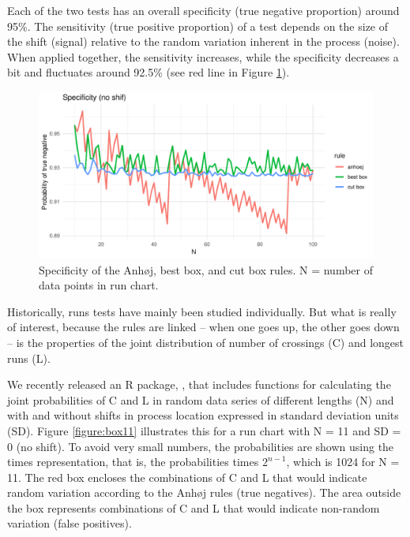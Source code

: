 Each of the two tests has an overall specificity (true negative
proportion) around 95\%. The sensitivity (true positive proportion) of a
test depends on the size of the shift (signal) relative to the random
variation inherent in the process (noise). When applied together, the
sensitivity increases, while the specificity decreases a bit and
fluctuates around 92.5\% (see red line in Figure \ref{figure:spec}).

\begin{figure}[htbp]
  \centering
  \includegraphics[width=\textwidth]{fig_spec.pdf}
  \caption{Specificity of the Anhøj, best box, and cut box rules. N = number of data points in run chart. }
  \label{figure:spec}
\end{figure}

Historically, runs tests have mainly been studied individually. But what
is really of interest, because the rules are linked -- when one goes up,
the other goes down -- is the properties of the joint distribution of
number of crossings (C) and longest runs (L).

We recently released an R package,  \citep{twl2018},
that includes functions for calculating the joint probabilities of C and
L in random data series of different lengths (N) and with and without
shifts in process location expressed in standard deviation units (SD).
Figure \ref{figure:box11} illustrates this for a run chart with N = 11
and SD = 0 (no shift). To avoid very small numbers, the probabilities
are shown using the times representation, that is, the probabilities
times \(2^{n-1}\), which is 1024 for N = 11. The red box encloses the
combinations of C and L that would indicate random variation according
to the Anhøj rules (true negatives). The area outside the box represents
combinations of C and L that would indicate non-random variation (false
positives).

